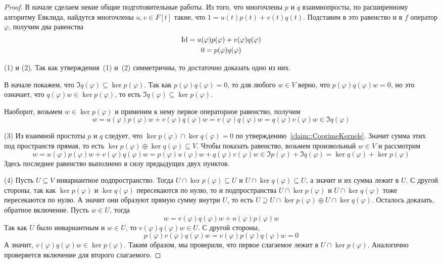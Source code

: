 \begin{proof}
В начале сделаем некие общие подготовительные работы.
Из того, что многочлены $p$ и $q$ взаимнопросты, по расширенному алгоритму Евклида, найдутся многочлены $u,v\in F[t]$ такие, что $1 = u(t)p(t) + v(t)q(t)$.
Подставим в это равенство и в $f$ оператор $\varphi$, получим два равенства
\begin{gather*}
\operatorname{Id} = u(\varphi) p(\varphi) + v(\varphi) q(\varphi)\\
0 = p(\varphi) q(\varphi)
\end{gather*}

(1) и (2).
Так как утверждения~(1) и~(2) симметричны, то достаточно доказать одно из них.

В начале покажем, что $\Im q(\varphi)\subseteq \ker p(\varphi)$.
Так как $p(\varphi)q(\varphi) = 0$, то для любого $w\in V$ верно, что $p(\varphi)q(\varphi)w = 0$, но это означает, что $q(\varphi)w \in\ker p(\varphi)$, то есть $\Im q(\varphi)\subseteq \ker p(\varphi)$.

Наоборот, возьмем $w\in \ker p(\varphi)$ и применим к нему первое операторное равенство, получим
\[
w = u(\varphi) p(\varphi) w + v(\varphi) q(\varphi) w = v(\varphi) q(\varphi) w =   q(\varphi) v(\varphi) w\in \Im q(\varphi)
\]

(3) Из взаимной простоты $p$ и $q$ следует, что $\ker p(\varphi) \cap \ker q(\varphi) = 0$ по утверждению~\ref{claim::CoprimeKernels}.
Значит сумма этих под пространств прямая, то есть $\ker p(\varphi) \oplus \ker q(\varphi) \subseteq V$.
Чтобы показать равенство, возьмем произвольный $w\in V$ и рассмотрим
\[
w = u(\varphi) p(\varphi) w + v(\varphi) q(\varphi) w = p(\varphi) u(\varphi) w + q(\varphi) v(\varphi) w\in \Im p(\varphi) +\Im q(\varphi) = \ker q(\varphi) + \ker p(\varphi)
\]
Здесь последнее равенство выполнено в силу предыдущих двух пунктов.

(4) Пусть $U\subseteq V$ инвариантное подпространство.
Тогда $U\cap \ker p(\varphi) \subseteq U$ и $U\cap \ker q(\varphi) \subseteq U$, а значит и их сумма лежит в $U$.
С другой стороны, так как $\ker p(\varphi)$ и $\ker q(\varphi)$ пересекаются по нулю, то и подпространства $U\cap \ker p(\varphi)$ и $U\cap \ker q(\varphi)$ тоже пересекаются по нулю.
А значит они образуют прямую сумму внутри $U$, то есть $U \supseteq U\cap \ker p(\varphi) \oplus U \cap \ker q(\varphi)$.
Осталось доказать, обратное включение.
Пусть $w\in U$, тогда 
\[
w = v(\varphi) q(\varphi) w + u(\varphi) p(\varphi) w
\]
Так как $U$ было инвариантным и  $w\in U$, то $v(\varphi) q(\varphi) w \in U$.
С другой стороны,
\[
p(\varphi) v(\varphi) q(\varphi) w = v(\varphi) p(\varphi)  q(\varphi) w = 0
\]
А значит, $v(\varphi) q(\varphi) w\in \ker p(\varphi)$.
Таким образом, мы проверили, что первое слагаемое лежит в $U\cap \ker p(\varphi)$.
Аналогично проверяется включение для второго слагаемого.


\end{proof}
